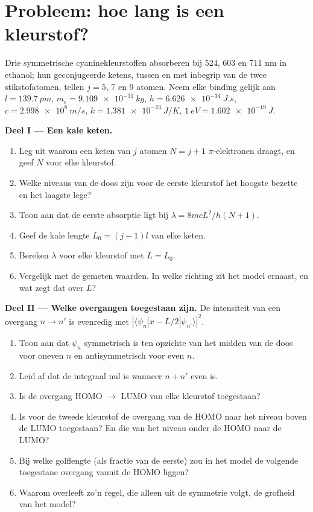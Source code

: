 \section{Probleem: hoe lang is een kleurstof?}

\begin{problem}
\label{pb:b3:quantum-model-systems:1}
Drie symmetrische cyaninekleurstoffen absorberen bij 524, 603 en 711 nm in
ethanol; hun geconjugeerde ketens, tussen en met inbegrip van de twee
stikstofatomen, tellen $j = 5$, 7
en 9 atomen. Neem elke binding gelijk aan $l = \qty{139.7}{pm}$, $m_e =
\qty{9.109e-31}{kg}$, $h = \qty{6.626e-34}{J.s}$, $c = \qty{2.998e8}{m/s}$,
$k = \qty{1.381e-23}{J/K}$, $\qty{1}{eV} = \qty{1.602e-19}{J}$.

\medskip\noindent\textbf{Deel I --- Een kale keten.}
\begin{enumerate}
  \item Leg uit waarom een keten van $j$ atomen $N = j + 1$ $\pi$-elektronen
        draagt, en geef $N$ voor elke kleurstof.
  \item Welke niveaus van de doos zijn voor de eerste kleurstof het hoogste
        bezette en het laagste lege?
  \item Toon aan dat de eerste absorptie ligt bij $\lambda = 8mcL^2/h(N+1)$.
  \item Geef de kale lengte $L_0 = (j - 1)l$ van elke keten.
  \item Bereken $\lambda$ voor elke kleurstof met $L = L_0$.
  \item Vergelijk met de gemeten waarden. In welke richting zit het model
        ernaast, en wat zegt dat over $L$?
\end{enumerate}

\medskip\noindent\textbf{Deel II --- Welke overgangen toegestaan zijn.}
De intensiteit van een overgang $n \to n'$ is evenredig met $|\langle
\psi_n|x - L/2|\psi_{n'}\rangle|^2$.
\begin{enumerate}[resume]
  \item Toon aan dat $\psi_n$ symmetrisch is ten opzichte van het midden van
        de doos voor oneven $n$ en antisymmetrisch voor even $n$.
  \item Leid af dat de integraal nul is wanneer $n + n'$ even is.
  \item Is de overgang HOMO $\to$ LUMO van elke kleurstof toegestaan?
  \item Is voor de tweede kleurstof de overgang van de HOMO naar het niveau
        boven de LUMO toegestaan? En die van het niveau onder de HOMO naar de LUMO?
  \item Bij welke golflengte (als fractie van de eerste) zou in het model
        de volgende toegestane overgang vanuit de HOMO liggen?
  \item Waarom overleeft zo'n regel, die alleen uit de symmetrie volgt, de
        grofheid van het model?
\end{enumerate}


\end{problem}
